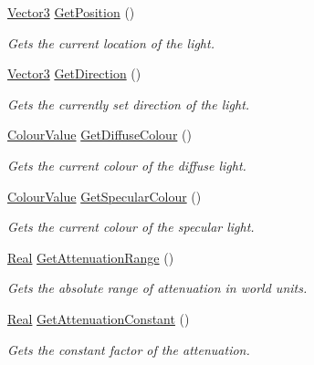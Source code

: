 \begin{DoxyCompactItemize}
\hyperlink{classphys_1_1Vector3}{Vector3} \hyperlink{classphys_1_1Light_ae2211ed844f8f5e25bcb74c3222a87d1}{GetPosition} ()
\begin{DoxyCompactList}\small\item\em Gets the current location of the light. \item\end{DoxyCompactList}\item 
\hyperlink{classphys_1_1Vector3}{Vector3} \hyperlink{classphys_1_1Light_a2c7051ac99d359da14b192852f78bc69}{GetDirection} ()
\begin{DoxyCompactList}\small\item\em Gets the currently set direction of the light. \item\end{DoxyCompactList}\item 
\hyperlink{classphys_1_1ColourValue}{ColourValue} \hyperlink{classphys_1_1Light_a2f21391ae6a8bf6cc8c8a6b1196f0ed4}{GetDiffuseColour} ()
\begin{DoxyCompactList}\small\item\em Gets the current colour of the diffuse light. \item\end{DoxyCompactList}\item 
\hyperlink{classphys_1_1ColourValue}{ColourValue} \hyperlink{classphys_1_1Light_abaf4675bac9f769706f91ccacfdd278e}{GetSpecularColour} ()
\begin{DoxyCompactList}\small\item\em Gets the current colour of the specular light. \item\end{DoxyCompactList}\item 
\hyperlink{namespacephys_af7eb897198d265b8e868f45240230d5f}{Real} \hyperlink{classphys_1_1Light_a23a8b0fe2bee88d45ef647165357186a}{GetAttenuationRange} ()
\begin{DoxyCompactList}\small\item\em Gets the absolute range of attenuation in world units. \item\end{DoxyCompactList}\item 
\hyperlink{namespacephys_af7eb897198d265b8e868f45240230d5f}{Real} \hyperlink{classphys_1_1Light_afc87c26ec4500caf94c6210329c091f9}{GetAttenuationConstant} ()
\begin{DoxyCompactList}\small\item\em Gets the constant factor of the attenuation. \item\end{DoxyCompactList}\item 

\end{DoxyCompactItemize}
